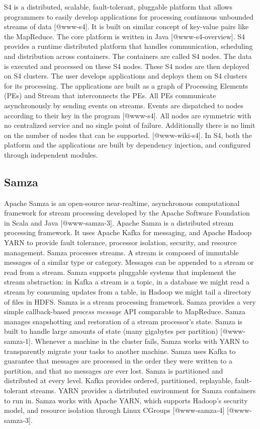 S4 is a distributed, scalable, fault-tolerant, pluggable platform that
allows programmers to easily develop applications for processing
continuous unbounded streams of data [@www-s4]. It is built on
similar concept of key-value pairs like the MapReduce. The core
platform is written in Java [@www-s4-overview]. S4 provides a
runtime distributed platform that handles communication, scheduling
and distribution across containers. The containers are called S4
nodes. The data is executed and processed on these S4 nodes. These S4
nodes are then deployed on S4 clusters. The user develops applications
and deploys them on S4 clusters for its processing. The applications
are built as a graph of Processing Elements (PEs) and Stream that
interconnects the PEs. All PEs communicate asynchronously by sending
events on streams. Events are dispatched to nodes according to their
key in the program [@www-s4]. All nodes are symmetric with no
centralized service and no single point of failure. Additionally there
is no limit on the number of nodes that can be
supported. [@www-wiki-s4]. In S4, both the platform and the
applications are built by dependency injection, and configured through
independent modules.




     
\subsection{Samza}

Apache Samza is an open-source near-realtime, asynchronous
computational framework for stream processing developed by the Apache
Software Foundation in Scala and Java [@www-samza-3].  Apache
Samza is a distributed stream processing framework. It uses Apache
Kafka for messaging, and Apache Hadoop YARN to provide fault
tolerance, processor isolation, security, and resource
management. Samza processes streams. A stream is composed of immutable
messages of a similar type or category. Messages can be appended to a
stream or read from a stream.  Samza supports pluggable systems that
implement the stream abstraction: in Kafka a stream is a topic, in a
database we might read a stream by consuming updates from a table, in
Hadoop we might tail a directory of files in HDFS. Samza is a stream
processing framework. Samza provides a very simple callback-based
\textit{process message} API comparable to MapReduce.  Samza manages
snapshotting and restoration of a stream processor's state.  Samza is
built to handle large amounts of state (many gigabytes per
partition) [@www-samza-1].  Whenever a machine in the cluster
fails, Samza works with YARN to transparently migrate your tasks to
another machine. Samza uses Kafka to guarantee that messages are
processed in the order they were written to a partition, and that no
messages are ever lost.  Samza is partitioned and distributed at every
level. Kafka provides ordered, partitioned, replayable, fault-tolerant
streams. YARN provides a distributed environment for Samza containers
to run in. Samza works with Apache YARN, which supports Hadoop's
security model, and resource isolation through Linux
CGroups [@www-samza-4] [@www-samza-3].

